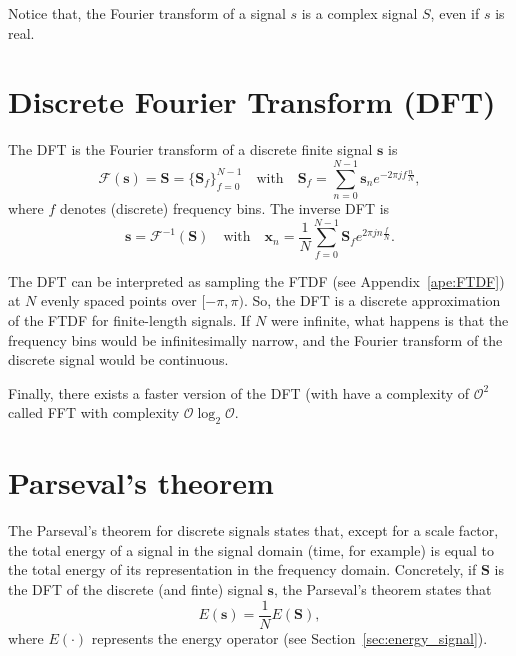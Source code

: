 Notice that, the Fourier transform of a signal $s$ is a complex signal
$S$, even if $s$ is real.


\section{Discrete Fourier Transform (DFT)}
\label{sec:DFT}

The \gls{DFT} is the Fourier transform of a discrete finite signal $\mathbf{s}$ is
\begin{equation}
  \mathcal{F}(\mathbf{s}) = \mathbf{S} = \{\mathbf{S}_f\}_{f=0}^{N-1} \quad \text{with} \quad \mathbf{S}_f=\sum_{n=0}^{N-1}\mathbf{s}_ne^{-2\pi jf\frac{n}{N}},
  \label{eq:DFT}
\end{equation}
where $f$ denotes (discrete) frequency bins. The inverse \gls{DFT} is
\begin{equation}
  \mathbf{s} = \mathcal{F}^{-1}(\mathbf{S}) \quad \text{with} \quad \mathbf{x}_n = \frac{1}{N}\sum_{f=0}^{N-1}\mathbf{S}_fe^{2\pi jn\frac{f}{N}}.
\end{equation}

The \gls{DFT} can be interpreted as sampling the \gls{FTDF} (see
Appendix~\ref{ape:FTDF}) at $N$ evenly spaced points over
$[-\pi, \pi)$. So, the \gls{DFT} is a discrete approximation of the
\gls{FTDF} for finite-length signals. If $N$ were infinite, what
happens is that the frequency bins would be infinitesimally narrow,
and the Fourier transform of the discrete signal would be continuous.

Finally, there exists a faster version of the \gls{DFT} (with have a
complexity of $\mathcal{O}^2$ called \gls{FFT} with complexity
$\mathcal{O}\log_2\mathcal{O}$.


\section{Parseval's theorem}
\label{sec:parseval}

The Parseval's theorem for discrete signals states that, except for a
scale factor, the total energy of a signal in the signal domain (time,
for example) is equal to the total energy of its representation in the
frequency domain. Concretely, if $\mathbf{S}$ is the \gls{DFT} of the
discrete (and finte) signal $\mathbf{s}$, the Parseval’s theorem
states that
\begin{equation}
  E(\mathbf{s}) = \frac{1}{N}E(\mathbf{S}),
\end{equation}
where $E(\cdot)$ represents the energy operator (see
Section~\ref{sec:energy_signal}).

